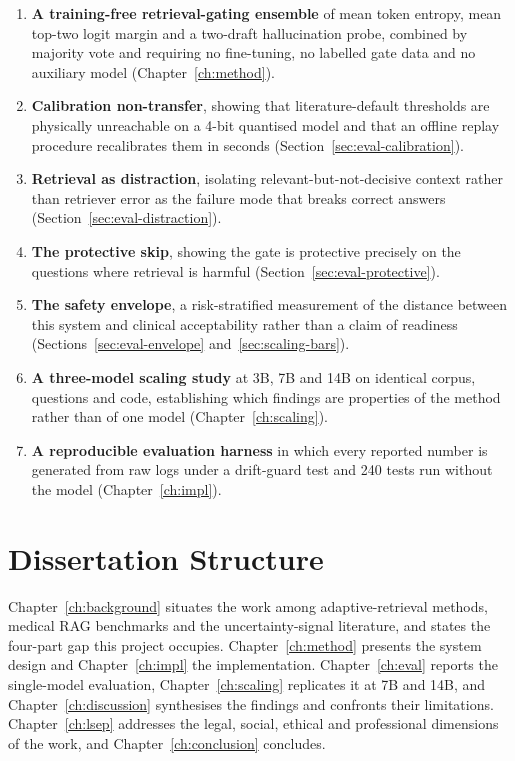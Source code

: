 \begin{enumerate}
  \item \textbf{A training-free retrieval-gating ensemble} of mean token
    entropy, mean top-two logit margin and a two-draft hallucination probe,
    combined by majority vote and requiring no fine-tuning, no labelled gate
    data and no auxiliary model (Chapter~\ref{ch:method}).
  \item \textbf{Calibration non-transfer}, showing that literature-default
    thresholds are physically unreachable on a 4-bit quantised model and that
    an offline replay procedure recalibrates them in seconds
    (Section~\ref{sec:eval-calibration}).
  \item \textbf{Retrieval as distraction}, isolating relevant-but-not-decisive
    context rather than retriever error as the failure mode that breaks
    correct answers (Section~\ref{sec:eval-distraction}).
  \item \textbf{The protective skip}, showing the gate is protective precisely
    on the questions where retrieval is harmful
    (Section~\ref{sec:eval-protective}).
  \item \textbf{The safety envelope}, a risk-stratified measurement of the
    distance between this system and clinical acceptability rather than a
    claim of readiness (Sections~\ref{sec:eval-envelope}
    and~\ref{sec:scaling-bars}).
  \item \textbf{A three-model scaling study} at 3B, 7B and 14B on identical
    corpus, questions and code, establishing which findings are properties of
    the method rather than of one model (Chapter~\ref{ch:scaling}).
  \item \textbf{A reproducible evaluation harness} in which every reported
    number is generated from raw logs under a drift-guard test and 240 tests
    run without the model (Chapter~\ref{ch:impl}).
\end{enumerate}

\section{Dissertation Structure}
\label{sec:intro-structure}

Chapter~\ref{ch:background} situates the work among adaptive-retrieval
methods, medical RAG benchmarks and the uncertainty-signal literature, and
states the four-part gap this project occupies. Chapter~\ref{ch:method}
presents the system design and Chapter~\ref{ch:impl} the implementation.
Chapter~\ref{ch:eval} reports the single-model evaluation,
Chapter~\ref{ch:scaling} replicates it at 7B and 14B, and
Chapter~\ref{ch:discussion} synthesises the findings and confronts their
limitations. Chapter~\ref{ch:lsep} addresses the legal, social, ethical and
professional dimensions of the work, and Chapter~\ref{ch:conclusion}
concludes.